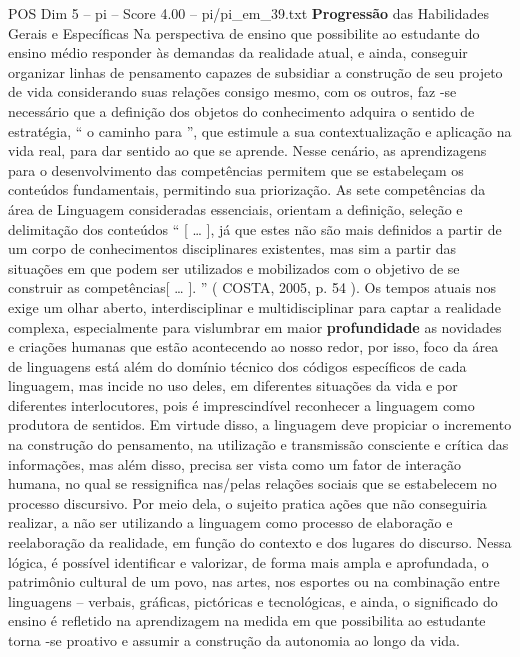 \begin{textsample}{POS Dim 5 – pi – Score 4.00 – pi/pi\_em\_39.txt}  \label{ex:f5_pos_236}
\textbf{Progressão} das Habilidades Gerais e Específicas Na perspectiva de ensino que possibilite ao estudante do ensino médio responder às demandas da realidade atual, e ainda, conseguir organizar linhas de pensamento capazes de subsidiar a construção de seu projeto de vida considerando suas relações consigo mesmo, com os outros, faz -se necessário que a definição dos objetos do conhecimento adquira o sentido de estratégia, “ o caminho para ”, que estimule a sua contextualização e aplicação na vida real, para dar sentido ao que se aprende.
Nesse cenário, as aprendizagens para o desenvolvimento das competências permitem que se estabeleçam os conteúdos fundamentais, permitindo sua priorização.
As sete competências da área de Linguagem consideradas essenciais, orientam a definição, seleção e delimitação dos conteúdos “ [ … ], já que estes não são mais definidos a partir de um corpo de conhecimentos disciplinares existentes, mas sim a partir das situações em que podem ser utilizados e mobilizados com o objetivo de se construir as competências[ … ]. ” ( COSTA, 2005, p. 54 ).
Os tempos atuais nos exige um olhar aberto, interdisciplinar e multidisciplinar para captar a realidade complexa, especialmente para vislumbrar em maior \textbf{profundidade} as novidades e criações humanas que estão acontecendo ao nosso redor, por isso, foco da área de linguagens está além do domínio técnico dos códigos específicos de cada linguagem, mas incide no uso deles, em diferentes situações da vida e por diferentes interlocutores, pois é imprescindível reconhecer a linguagem como produtora de sentidos.
Em virtude disso, a linguagem deve propiciar o incremento na construção do pensamento, na utilização e transmissão consciente e crítica das informações, mas além disso, precisa ser vista como um fator de interação humana, no qual se ressignifica nas/pelas relações sociais que se estabelecem no processo discursivo.
Por meio dela, o sujeito pratica ações que não conseguiria realizar, a não ser utilizando a linguagem como processo de elaboração e reelaboração da realidade, em função do contexto e dos lugares do discurso.
Nessa lógica, é possível identificar e valorizar, de forma mais ampla e aprofundada, o patrimônio cultural de um povo, nas artes, nos esportes ou na combinação entre linguagens – verbais, gráficas, pictóricas e tecnológicas, e ainda, o significado do ensino é refletido na aprendizagem na medida em que possibilita ao estudante torna -se proativo e assumir a construção da autonomia ao longo da vida.

\end{textsample}
